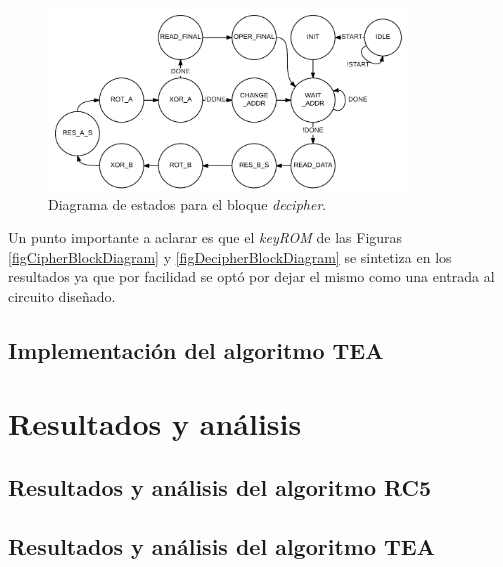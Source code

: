 \begin{figure}
	\centering
	\includegraphics[width=0.85\textwidth]{./images/figDecipherFSM}
	\caption{Diagrama de estados para el bloque \textit{decipher}.}
	\label{figDecipherFSM}
\end{figure}

Un punto importante a aclarar es que el \textit{keyROM} de las Figuras \ref{figCipherBlockDiagram} y \ref{figDecipherBlockDiagram} se sintetiza en los resultados ya que por facilidad se optó por dejar el mismo como una entrada al circuito diseñado.


\section{Implementación del algoritmo TEA}
\blindtext
\cleardoublepage







\chapter{Resultados y análisis}

\section{Resultados y análisis del algoritmo RC5}
\blindtext
\cleardoublepage

\section{Resultados y análisis del algoritmo TEA}
\blindtext
\cleardoublepage

